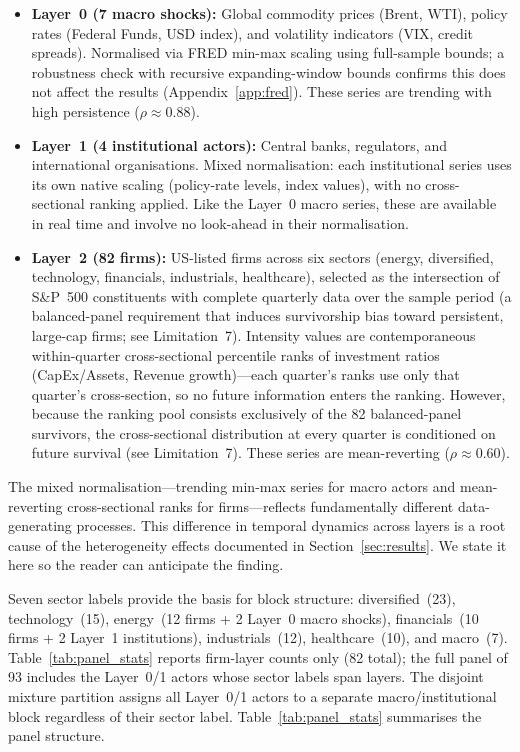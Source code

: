 \documentclass[11pt,a4paper]{article}
\begin{document}
\begin{itemize}[nosep]
  \item \textbf{Layer~0 (7 macro shocks):} Global commodity prices (Brent, WTI), policy rates (Federal Funds, USD index), and volatility indicators (VIX, credit spreads). Normalised via FRED min-max scaling using full-sample bounds; a robustness check with recursive expanding-window bounds confirms this does not affect the results (Appendix~\ref{app:fred}). These series are trending with high persistence ($\rho \approx 0.88$).
  \item \textbf{Layer~1 (4 institutional actors):} Central banks, regulators, and international organisations. Mixed normalisation: each institutional series uses its own native scaling (policy-rate levels, index values), with no cross-sectional ranking applied. Like the Layer~0 macro series, these are available in real time and involve no look-ahead in their normalisation.
  \item \textbf{Layer~2 (82 firms):} US-listed firms across six sectors (energy, diversified, technology, financials, industrials, healthcare), selected as the intersection of S\&P~500 constituents with complete quarterly data over the sample period (a balanced-panel requirement that induces survivorship bias toward persistent, large-cap firms; see Limitation~7). Intensity values are contemporaneous within-quarter cross-sectional percentile ranks of investment ratios (CapEx/Assets, Revenue growth)---each quarter's ranks use only that quarter's cross-section, so no future information enters the ranking. However, because the ranking pool consists exclusively of the 82 balanced-panel survivors, the cross-sectional distribution at every quarter is conditioned on future survival (see Limitation~7). These series are mean-reverting ($\rho \approx 0.60$).
\end{itemize}

The mixed normalisation---trending min-max series for macro actors and mean-reverting cross-sectional ranks for firms---reflects fundamentally different data-generating processes. This difference in temporal dynamics across layers is a root cause of the heterogeneity effects documented in Section~\ref{sec:results}. We state it here so the reader can anticipate the finding.

Seven sector labels provide the basis for block structure: diversified~(23), technology~(15), energy~(12 firms + 2 Layer~0 macro shocks), financials~(10 firms + 2 Layer~1 institutions), industrials~(12), healthcare~(10), and macro~(7). Table~\ref{tab:panel_stats} reports firm-layer counts only (82 total); the full panel of 93 includes the Layer~0/1 actors whose sector labels span layers. The disjoint mixture partition assigns all Layer~0/1 actors to a separate macro/institutional block regardless of their sector label. Table~\ref{tab:panel_stats} summarises the panel structure.
\end{document}
